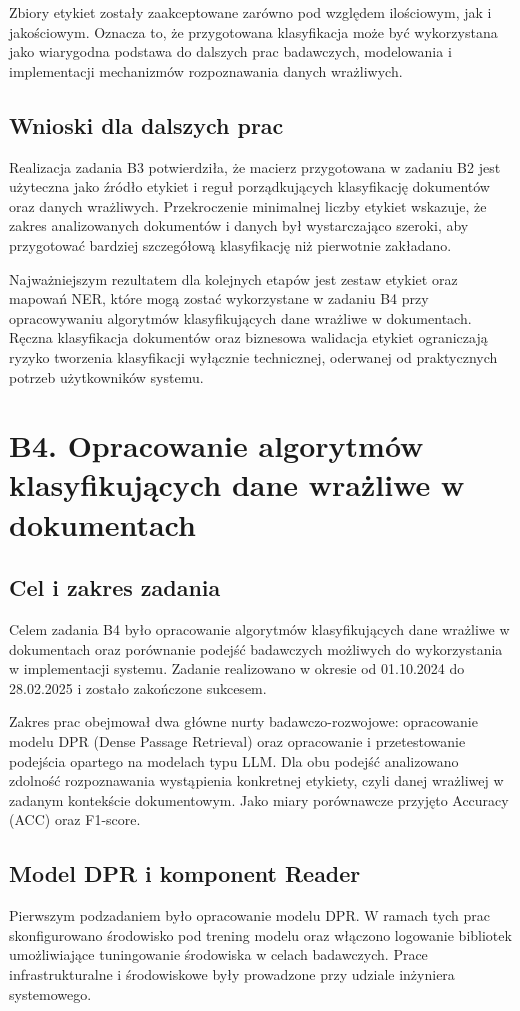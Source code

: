 \documentclass[12pt,a4paper]{report}
\begin{document}
Zbiory etykiet zostały zaakceptowane zarówno pod względem ilościowym, jak i jakościowym. Oznacza to, że przygotowana klasyfikacja może być wykorzystana jako wiarygodna podstawa do dalszych prac badawczych, modelowania i implementacji mechanizmów rozpoznawania danych wrażliwych.

\subsection{Wnioski dla dalszych prac}
Realizacja zadania B3 potwierdziła, że macierz przygotowana w zadaniu B2 jest użyteczna jako źródło etykiet i reguł porządkujących klasyfikację dokumentów oraz danych wrażliwych. Przekroczenie minimalnej liczby etykiet wskazuje, że zakres analizowanych dokumentów i danych był wystarczająco szeroki, aby przygotować bardziej szczegółową klasyfikację niż pierwotnie zakładano.

Najważniejszym rezultatem dla kolejnych etapów jest zestaw etykiet oraz mapowań NER, które mogą zostać wykorzystane w zadaniu B4 przy opracowywaniu algorytmów klasyfikujących dane wrażliwe w dokumentach. Ręczna klasyfikacja dokumentów oraz biznesowa walidacja etykiet ograniczają ryzyko tworzenia klasyfikacji wyłącznie technicznej, oderwanej od praktycznych potrzeb użytkowników systemu.



\section{B4. Opracowanie algorytmów klasyfikujących dane wrażliwe w dokumentach}
\subsection{Cel i zakres zadania}
Celem zadania B4 było opracowanie algorytmów klasyfikujących dane wrażliwe w dokumentach oraz porównanie podejść badawczych możliwych do wykorzystania w implementacji systemu. Zadanie realizowano w okresie od 01.10.2024 do 28.02.2025 i zostało zakończone sukcesem.

Zakres prac obejmował dwa główne nurty badawczo-rozwojowe: opracowanie modelu DPR (Dense Passage Retrieval) oraz opracowanie i przetestowanie podejścia opartego na modelach typu LLM. Dla obu podejść analizowano zdolność rozpoznawania wystąpienia konkretnej etykiety, czyli danej wrażliwej w zadanym kontekście dokumentowym. Jako miary porównawcze przyjęto Accuracy (ACC) oraz F1-score.

\subsection{Model DPR i komponent Reader}
Pierwszym podzadaniem było opracowanie modelu DPR. W ramach tych prac skonfigurowano środowisko pod trening modelu oraz włączono logowanie bibliotek umożliwiające tuningowanie środowiska w celach badawczych. Prace infrastrukturalne i środowiskowe były prowadzone przy udziale inżyniera systemowego.
\end{document}
